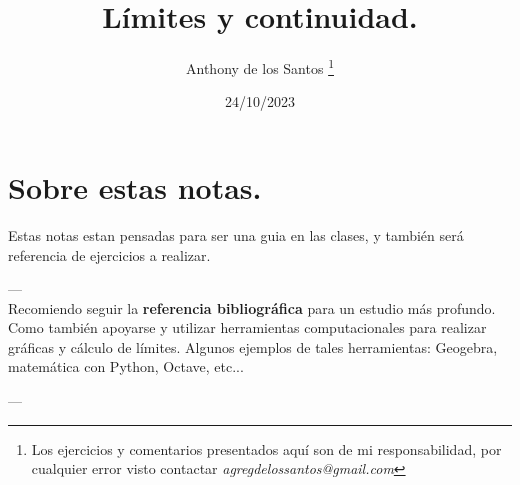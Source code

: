 \documentclass[11pt, a4paper]{article}
\title{ L\'imites y continuidad. }
\author{ Anthony de los Santos \footnote{ Los ejercicios y comentarios presentados aqu\'i son de mi responsabilidad, por cualquier
error visto contactar  \textit{agregdelossantos@gmail.com} } }
\date{ 24/10/2023 }
\begin{document}

\maketitle 

\newpage

\tableofcontents

\newpage



\vspace{20px}

\section{ Sobre estas notas. }

Estas notas estan pensadas para ser una guia en las clases, y tambi\'en ser\'a referencia 
de ejercicios a realizar. 

--- \\
Recomiendo seguir la \textbf{referencia bibliogr\'afica} para un estudio m\'as profundo. Como tambi\'en apoyarse y utilizar herramientas computacionales para realizar gr\'aficas y c\'alculo de l\'imites. Algunos ejemplos de tales herramientas: Geogebra, matem\'atica con Python, Octave, etc... 

--- \\


\end{document}
